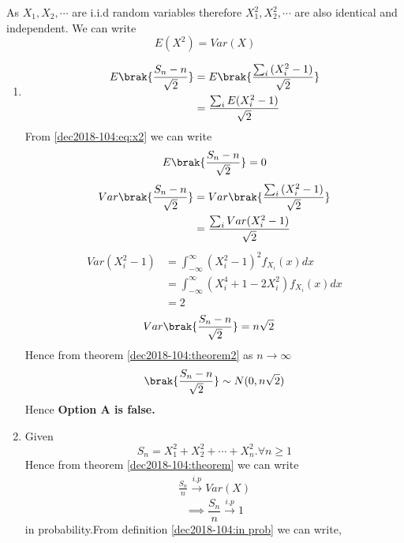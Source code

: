 As $X_1,X_2,\cdots $ are i.i.d random variables therefore $X_{1}^2,X_
{2}^2,\cdots$ are also identical and independent.
We can write
\begin{equation}
    E(X^2)=Var(X) \label{dec2018-104:eq:x2}
\end{equation}
\begin{enumerate}
\item \begin{align}
    E\brak{\frac{S_{n}-n}{\sqrt{2}}}&=E\brak{\frac{\sum_{i}{(X_{i}^{2}-1)}}{\sqrt{2}}}\\
    &={\frac{\sum_{i}E{(X_{i}^{2}-1)}}{\sqrt{2}}}\label{dec2018-104:eq:expectation}
\end{align}
From \eqref{dec2018-104:eq:x2} we can write
\begin{equation}
    E\brak{\frac{S_{n}-n}{\sqrt{2}}}=0
\end{equation}
\begin{align}
    Var\brak{\frac{S_{n}-n}{\sqrt{2}}}&=Var\brak{\frac{\sum_{i}{(X_{i}^{2}-1)}}{\sqrt{2}}}\\
    &={\frac{\sum_{i}Var{(X_{i}^{2}-1)}}{\sqrt{2}}}
\end{align}
\begin{align}
    Var(X_{i}^2-1)&=\int_{-\infty}^{\infty}(X_{i}^2-1)^2 f_{X_{i}}(x)dx\\
    &=\int_{-\infty}^{\infty}(X_{i}^4+1-2X_{i}^{2}) f_{X_{i}}(x)dx\\
    &=2\label{dec2018-104:eq:var}
\end{align}
\begin{align}
    Var\brak{\frac{S_{n}-n}{\sqrt{2}}}&=n\sqrt{2}    
\end{align}
Hence from theorem \ref{dec2018-104:theorem2} as $n \to \infty$
\begin{equation}
    \brak{\frac{S_{n}-n}{\sqrt{2}}}\sim N(0,n\sqrt{2})
\end{equation}
Hence \textbf{Option A is false.}
\item Given 
\begin{equation}
    S_{n}=X_{1}^2+X_{2}^2+\cdots+X_{n}^2.\forall n\geq 1
\end{equation}
Hence from theorem \ref{dec2018-104:theorem} we can write 
\begin{align}
    \frac{S_n}{n} \xrightarrow{i.p} Var(X)
\end{align}
\begin{equation}
    \implies \frac{S_n}{n} \xrightarrow{i.p} 1
\end{equation}
in probability.From definition \ref{dec2018-104:in prob} we can write,

\end{enumerate}
